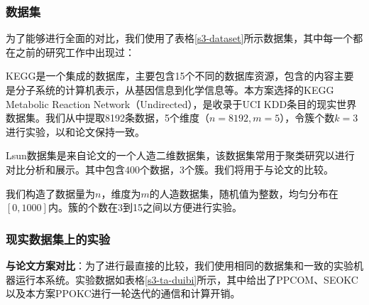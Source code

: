 \subsubsection{数据集}
为了能够进行全面的对比，我们使用了表格\ref{s3-dataset}所示数据集，其中每一个都在之前的研究工作中出现过：
\begin{compactitem}
	\item KEGG是一个集成的数据库，主要包含15个不同的数据库资源，包含的内容主要是分子系统的计算机表示，从基因信息到化学信息等。本方案选择的KEGG Metabolic Reaction Network（Undirected），是收录于UCI KDD条目的现实世界数据集\cite{naeem2011kegg}。我们从中提取8192条数据，5个维度（$ n=8192,m=5 $），令簇个数$ k=3 $进行实验，以和论文\cite{wu2020secure}保持一致。
	\item Lsun数据集是来自论文\cite{franti2018k}的一个人造二维数据集，该数据集常用于聚类研究以进行对比分析和展示。其中包含400个数据，3个簇。我们将用于与论文\cite{jaschke2019unsupervised}的比较。
	\item 我们构造了数据量为$ n $，维度为$ m $的人造数据集，随机值为整数，均匀分布在$ [0,1000] $内。簇的个数在3到15之间以方便进行实验。
\end{compactitem}
\begin{table}[htbp]
	\centering	
	\renewcommand{\arraystretch}{1.3}
	\caption{数据集详细信息}
	\label{s3-dataset}
\end{table}
\subsubsection{现实数据集上的实验}
\textbf{与论文\cite{wu2020secure}方案对比}：为了进行最直接的比较，我们使用相同的数据集和一致的实验机器运行本系统。实验数据如表格\ref{s3-ta-duibi}所示，其中给出了PPCOM\cite{rong2017privacy}、SEOKC\cite{wu2020secure}以及本方案PPOKC进行一轮迭代的通信和计算开销。

